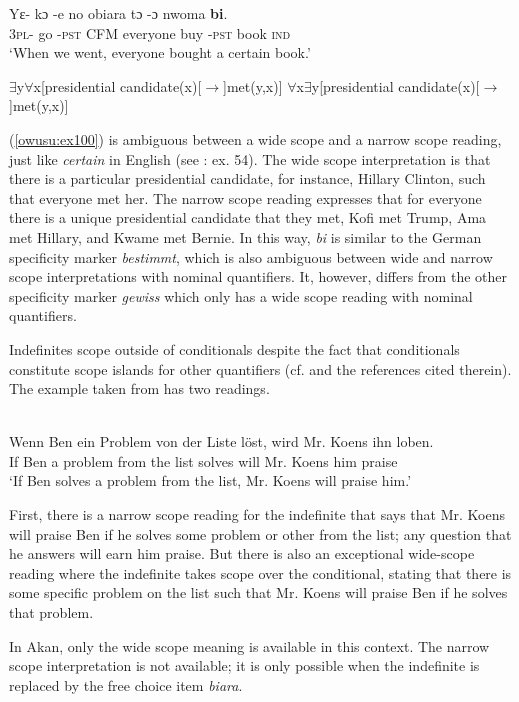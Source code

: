 \documentclass[output=paper,modfonts,nonflat,draftmode]{langsci/langscibook}
\begin{document}
\ex\label{owusu:ex15:2}
\gll  Yε- kɔ -e no obiara tɔ -ɔ  nwoma \textbf{bi}.\\
\textsc{3pl}- go -\textsc{pst}  CFM everyone buy -\textsc{pst} book \textsc{ind} \\
\glt `When we went, everyone bought a certain book.'
\z \z
 
 \ea
 \ea
$\exists$y$\forall$x[presidential candidate(x)[$\rightarrow$]met(y,x)]
\ex $\forall$x$\exists$y[presidential candidate(x)[$\rightarrow$]met(y,x)] 
\z\z

(\ref{owusu:ex100}) is ambiguous between a wide scope and a narrow scope reading, just like \emph{certain} in English  (see \citealt{Farkas2002}: ex. 54). The wide scope interpretation is that there is a particular presidential candidate, for instance, Hillary Clinton, such that everyone met her. The narrow scope reading expresses that for everyone there is a unique presidential candidate that they met, Kofi met Trump, Ama met Hillary, and Kwame met Bernie. In this way, \emph{bi} is similar to the German specificity marker \emph{bestimmt}, which is also ambiguous between wide and narrow scope interpretations with nominal quantifiers. It, however, differs from the other specificity marker \emph{gewiss} which only has a wide scope reading with nominal quantifiers.               
  
Indefinites scope outside of conditionals despite the fact that conditionals constitute scope islands for other quantifiers (cf. \citealt{FodorSag1982,Endriss2009} and the references cited therein). The example taken from \citet{Farkas2002} has two readings.

\ea\label{owusu:ex14}\\
\gll Wenn Ben ein Problem von der Liste löst, wird {Mr. Koens} ihn loben.\\
    If Ben a problem from the list solves will {Mr. Koens} him praise\\
\glt `If Ben solves a problem from the list, Mr. Koens will praise him.'
\z

First, there is a narrow scope reading for the indefinite that says that  Mr. Koens will praise Ben if he solves some problem or other from the list; any question that he answers will earn him praise. But there is also an exceptional wide-scope reading where the indefinite takes scope over the conditional, stating that there is some specific problem on the list such that Mr. Koens will praise Ben if he solves that problem. 

In Akan, only the wide scope meaning is available in this context. The narrow scope interpretation is not available; it is only possible when the indefinite is replaced by the free choice item \emph{biara}.
\end{document}
